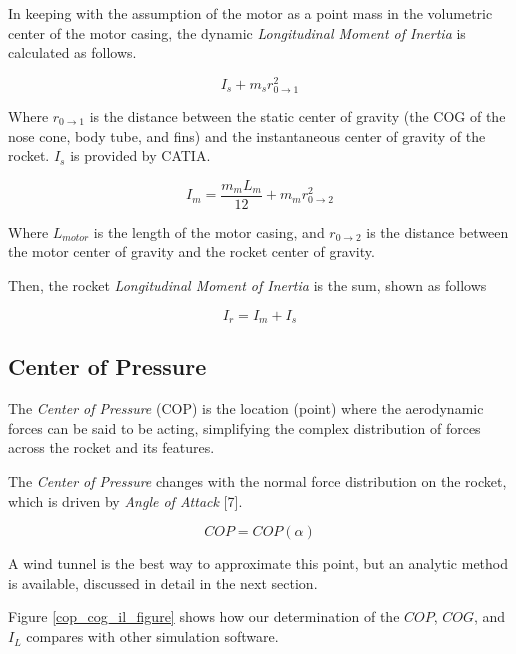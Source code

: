 \documentclass[]{book}
\begin{document}
In keeping with the assumption of the motor as a point mass in the
volumetric center of the motor casing, the dynamic \emph{Longitudinal
Moment of Inertia} is calculated as follows.

\begin{equation}
\label{static_longitudinal_moment_inertia}
I_{s} + m_{s} r_{0 \rightarrow 1}^2
\end{equation}

Where \(r_{0 \rightarrow 1}\) is the distance between the static center
of gravity (the COG of the nose cone, body tube, and fins) and the
instantaneous center of gravity of the rocket. \(I_{s}\) is provided by
CATIA.

\begin{equation}
\label{motor_longitudinal_moment_inertia}
I_{m} = \dfrac{m_{m}L_{m}}{12} + m_{m}r_{0 \rightarrow 2}^2
\end{equation}

Where \(L_{motor}\) is the length of the motor casing, and
\(r_{0 \rightarrow 2}\) is the distance between the motor center of
gravity and the rocket center of gravity.

Then, the rocket \emph{Longitudinal Moment of Inertia} is the sum, shown
as follows

\begin{equation}
\label{rocket_longitudinal_moment_inertia}
I_{r} = I_{m} + I_{s}
\end{equation}

\subsection{Center of Pressure}\label{center-of-pressure}

The \emph{Center of Pressure} (COP) is the location (point) where the
aerodynamic forces can be said to be acting, simplifying the complex
distribution of forces across the rocket and its features.

The \emph{Center of Pressure} changes with the normal force distribution
on the rocket, which is driven by \emph{Angle of Attack} {[}7{]}.

\[ COP = COP(\alpha) \]

A wind tunnel is the best way to approximate this point, but an analytic
method is available, discussed in detail in the next section.

Figure \ref{cop_cog_il_figure} shows how our determination of the
\(COP\), \(COG\), and \(I_L\) compares with other simulation software.
\end{document}
